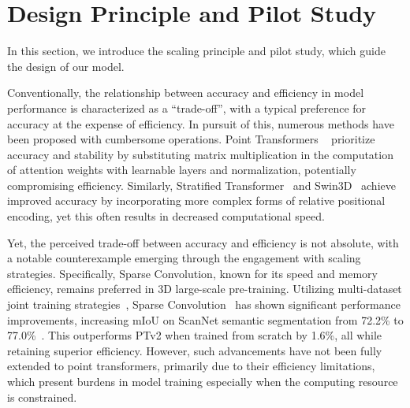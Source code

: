 \section{Design Principle and Pilot Study}
\label{sec:principles}
\vspace{-1mm}
In this section, we introduce the scaling principle and pilot study, which guide the design of our model.

\begin{table}[t]
    \begin{minipage}{0.48\textwidth}
    \centering
        \vspace{-4.1mm}
        
        \vspace{-2.2mm}
        \caption{\textbf{Model efficiency.} We benchmark the training and inference efficiency of backbones with various scales of receptive field. The batch size is fixed to 1, and the number after ``/" denotes the kernel size of sparse convolution and patch size\protect\footnotemark of attention.}\label{tab:outdoor_model_efficiency}
        \vspace{-6mm}
    \end{minipage}
\end{table}


Conventionally, the relationship between accuracy and efficiency in model performance is characterized as a ``trade-off'', with a typical preference for accuracy at the expense of efficiency. In pursuit of this, numerous methods have been proposed with cumbersome operations. Point Transformers ~\cite{zhao2021point, wu2022point} prioritize accuracy and stability by substituting matrix multiplication in the computation of attention weights with learnable layers and normalization, potentially compromising efficiency. Similarly, Stratified Transformer~\cite{lai2022stratified} and Swin3D~\cite{yang2023swin3d} achieve improved accuracy by incorporating more complex forms of relative positional encoding, yet this often results in decreased computational speed.

Yet, the perceived trade-off between accuracy and efficiency is not absolute, with a notable counterexample emerging through the engagement with scaling strategies. Specifically, Sparse Convolution, known for its speed and memory efficiency, remains preferred in 3D large-scale pre-training. Utilizing multi-dataset joint training strategies~\cite{wu2023ppt}, Sparse Convolution~\cite{graham20183d, choy20194d} has shown significant performance improvements, increasing mIoU on ScanNet semantic segmentation from 72.2\% to 77.0\%~\cite{zhu2023ponderv2}. This outperforms PTv2 when trained from scratch by 1.6\%, all while retaining superior efficiency. 
However, such advancements have not been fully extended to point transformers, primarily due to their efficiency limitations, which present burdens in model training especially when the computing resource is constrained.

